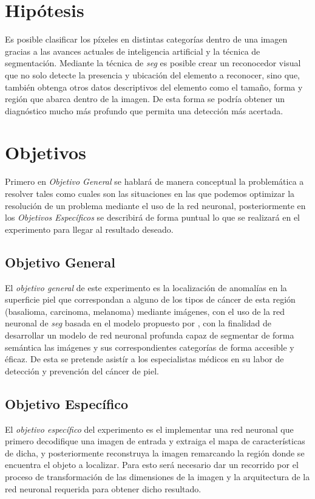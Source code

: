 \section{Hipótesis}
Es posible clasificar los píxeles en distintas categorías dentro de una imagen gracias a las avances actuales de inteligencia artificial y la técnica de segmentación. Mediante la técnica de \emph{\gls{seg}} es posible crear un reconocedor visual que no solo detecte la presencia y ubicación del elemento a reconocer, sino que, también obtenga otros datos descriptivos del elemento como el tamaño, forma y región que abarca dentro de la imagen. De esta forma se podría obtener un diagnóstico mucho más profundo que permita una detección más acertada.


\section{Objetivos}
Primero en \emph{Objetivo General} se hablará de manera conceptual la problemática a resolver tales como cuales son las situaciones en las que podemos optimizar la resolución de un problema mediante el uso de la red neuronal, posteriormente en los \emph{Objetivos Específicos} se describirá de forma puntual lo que se realizará en el experimento para llegar al resultado deseado.

\subsection{Objetivo General}
El \emph{objetivo general} de este experimento es la localización de anomalías en la superficie piel que correspondan a alguno de los tipos de cáncer de esta región (basalioma, carcinoma, melanoma) mediante imágenes, con el uso de la red neuronal de \emph{\gls{seg}} basada en el modelo propuesto por \citet{wu2019fastfcn}, con la finalidad de desarrollar un modelo de red neuronal profunda capaz de segmentar de forma semántica las imágenes y sus correspondientes categorías de forma accesible y éficaz. De esta se pretende asistír a los especialistas médicos en su labor de detección y prevención del cáncer de piel.


\subsection{Objetivo Específico}
El \emph{objetivo específico} del experimento es el implementar una red neuronal que primero decodifique una imagen de entrada y extraiga el mapa de características de dicha, y posteriormente reconstruya la imagen remarcando la región donde se encuentra el objeto a localizar. Para esto será necesario dar un recorrido por el proceso de transformación de las dimensiones de la imagen y la arquitectura de la red neuronal requerida para obtener dicho resultado.

